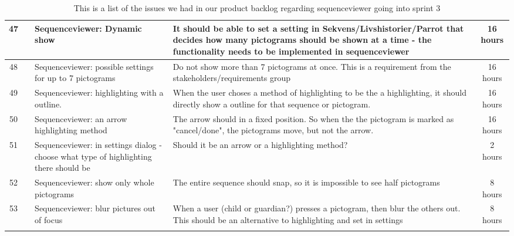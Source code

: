 \begin{longtable} { | c | c | p{5cm} | p{5cm} | c | } 
\hline
	47	&		 &	Sequenceviewer: Dynamic show	 &		It should be able to set a setting in Sekvens/Livshistorier/Parrot that decides how many pictograms should be shown at a time - the functionality needs to be implemented in sequenceviewer	 &	16 hours \\\hline
	48	&		 &	Sequenceviewer: possible settings for up to 7 pictograms		 &		Do not show more than 7 pictograms at once. This is a requirement from the stakeholders/requirements group			 & 	16 hours	\\\hline
	49	&		 &	Sequenceviewer: highlighting with a outline.	 &	When the user choses a method of highlighting to be the a highlighting, it should directly show a outline for that sequence or pictogram.			 &	16 hours \\\hline
	50	&		 &	Sequenceviewer: an arrow highlighting method	 &	The arrow should in a fixed position. So when the the pictogram is marked as "cancel/done", the pictograms move, but not the arrow.				 &	16 hours \\\hline
	51	&		 &	Sequenceviewer: in settings dialog - choose what type of highlighting there should be		 &	Should it be an arrow or a highlighting method?	 &	2 hours \\\hline
	52	&		 &	Sequenceviewer: show only whole pictograms		 & 	The entire sequence should snap, so it is impossible to see half pictograms	 &	8 hours	\\\hline
	53	&		 &	Sequenceviewer: blur pictures out of focus		 &	When a user (child or guardian?) presses a pictogram, then blur the others out. This should be an alternative to highlighting and set in settings			 &	8 hours \\\hline
\caption{This is a list of the issues we had in our product backlog regarding sequenceviewer going into sprint 3}
\label{tab:spr3_sw_prodblog}
\end{longtable}

